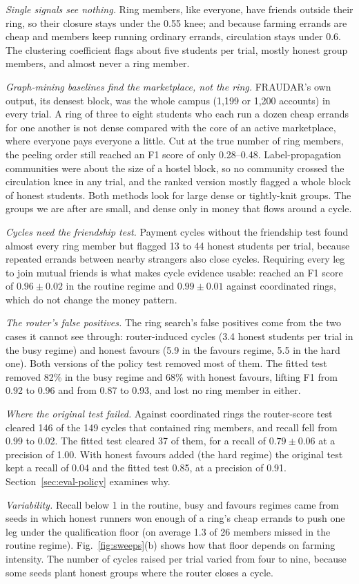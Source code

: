 \emph{Single signals see nothing.} Ring members, like everyone, have friends outside
their ring, so their closure stays under the 0.55 knee; and because farming errands
are cheap and members keep running ordinary errands, circulation stays under 0.6. The
clustering coefficient flags about five students per trial, mostly honest group
members, and almost never a ring member.

\emph{Graph-mining baselines find the marketplace, not the ring.} FRAUDAR's own
output, its densest block, was the whole campus (1,199 or 1,200 accounts) in every
trial. A ring of three to eight students who each run a dozen cheap errands for one
another is not dense compared with the core of an active marketplace, where everyone
pays everyone a little. Cut at the true number of ring members, the peeling order
still reached an F1 score of only 0.28--0.48. Label-propagation communities were about
the size of a hostel block, so no community crossed the circulation knee in any trial,
and the ranked version mostly flagged a whole block of honest students. Both methods
look for large dense or tightly-knit groups. The groups we are after are small, and
dense only in money that flows around a cycle.

\emph{Cycles need the friendship test.} Payment cycles without the friendship test
found almost every ring member but flagged 13 to 44 honest students per trial,
because repeated errands between nearby strangers also close cycles. Requiring every
leg to join mutual friends is what makes cycle evidence usable: 
reached an F1 score of $0.96\pm0.02$ in the routine regime and $0.99\pm0.01$ against
coordinated rings, which do not change the money pattern.

\emph{The router's false positives.} The ring search's false positives come from the
two cases it cannot see through: router-induced cycles (3.4 honest students per trial
in the busy regime) and honest favours (5.9 in the favours regime, 5.5 in the hard
one). Both versions of the policy test removed most of them. The fitted test removed
82\% in the busy regime and 68\% with honest favours, lifting F1 from 0.92 to 0.96 and
from 0.87 to 0.93, and lost no ring member in either.

\emph{Where the original test failed.} Against coordinated rings the router-score
test cleared 146 of the 149 cycles that contained ring members, and recall fell from
0.99 to 0.02. The fitted test cleared 37 of them, for a recall of $0.79\pm0.06$ at a
precision of 1.00. With honest favours added (the hard regime) the original test kept
a recall of 0.04 and the fitted test 0.85, at a precision of 0.91.
Section~\ref{sec:eval-policy} examines why.

\emph{Variability.} Recall below 1 in the routine, busy and favours regimes came from
seeds in which honest runners won enough of a ring's cheap errands to push one leg
under the qualification floor (on average 1.3 of 26 members missed in the routine
regime). Fig.~\ref{fig:sweeps}(b) shows how that floor depends on farming intensity.
The number of cycles raised per trial varied from four to nine, because some seeds
plant honest groups where the router closes a cycle.
